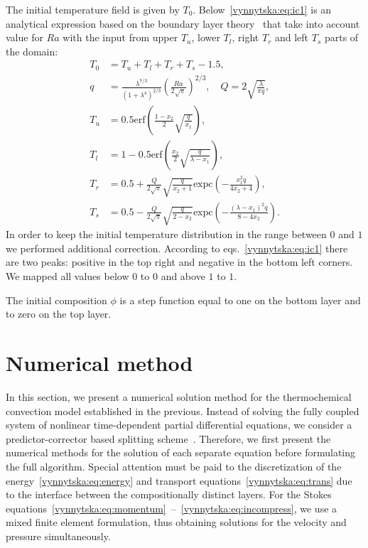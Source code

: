 The initial temperature field is given by $T_0$.
Below~\eqref{vynnytska:eq:ic1} is an analytical expression based on
the boundary layer theory~\citep{KekenEtAl1997} that take into account
value for $Ra$ with the input from upper $T_u$, lower $T_l$, right
$T_r$ and left $T_s$ parts of the domain:
\begin{subequations}
  \label{vynnytska:eq:ic1}
  \begin{align}
    T_0 &= T_u + T_l + T_r + T_s - 1.5, \\
    q &= \frac{\lambda^{7/3}}{\left(1 + \lambda^4 \right)^{2/3}} \left( \frac{Ra}{2 \sqrt{\pi}}\right)^{2/3}, \quad Q  = 2\sqrt{\frac{\lambda}{\pi q}},   \\
    T_u &= 0.5 \mathrm{erf} \left( \frac{1-x_2}{2} \sqrt{\frac{q}{x_1}  } \right), \\
    T_l &= 1 - 0.5 \mathrm{erf} \left( \frac{x_2}{2} \sqrt{\frac{q}{\lambda - x_1}  } \right), \\
    T_r &= 0.5 + \frac{Q}{2\sqrt{\pi}} \sqrt{\frac{q}{x_{2} + 1} } \mathrm{expc} \left( - \frac{x_1^2 q}{4 x_2 + 4} \right), \\
    T_s &= 0.5 - \frac{Q}{2\sqrt{\pi}} \sqrt{\frac{q}{2 - x_{2}} } \mathrm{expc} \left( - \frac{ \left(\lambda - x_1 \right)^2  q}{8 - 4 x_2} \right).
  \end{align}
\end{subequations}
In order to keep the initial temperature distribution in the range
between $0$ and $1$ we performed additional correction. According to
eqs.~\eqref{vynnytska:eq:ic1} there are two peaks: positive in the top
right and negative in the bottom left corners. We mapped all values
below $0$ to $0$ and above $1$ to $1$.

The initial composition $\phi$ is a step function equal to one on the
bottom layer and to zero on the top layer.


\section{Numerical method}
In this section, we present a numerical solution method for the
thermochemical convection model established in the previous. Instead
of solving the fully coupled system of nonlinear time-dependent
partial differential equations, we consider a predictor-corrector
based splitting scheme~\citep{BergKekenYuen1993,
HansenEbel1988}. Therefore, we first present the numerical methods for
the solution of each separate equation before formulating the full
algorithm. Special attention must be paid to the discretization of the
energy~\eqref{vynnytska:eq:energy} and transport
equations~\eqref{vynnytska:eq:trans} due to the interface between the
compositionally distinct layers. For the Stokes
equations~\eqref{vynnytska:eq:momentum}~--~\eqref{vynnytska:eq:incompress},
we use a mixed finite element formulation, thus obtaining solutions
for the velocity and pressure simultaneously.

